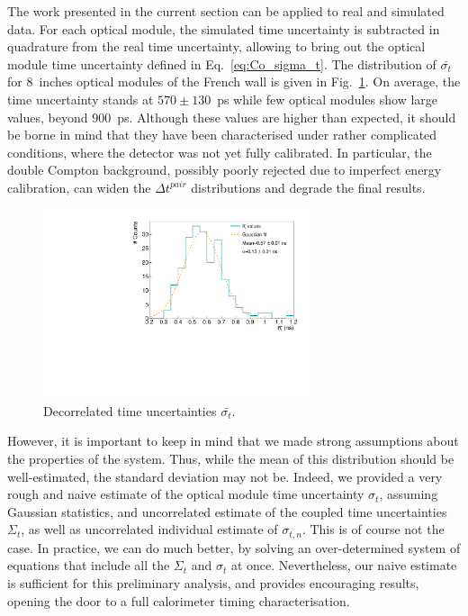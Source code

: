 The work presented in the current section can be applied to real and simulated data.
For each optical module, the simulated time uncertainty is subtracted in quadrature from the real time uncertainty, allowing to bring out the optical module time uncertainty defined in Eq.~\eqref{eq:Co_sigma_t}.
The distribution of $\bar{\sigma_{t}}$ for $8$~inches optical modules of the French wall is given in Fig.~\ref{fig:final_sigmas}.
On average, the time uncertainty stands at $570\pm130$~ps while few optical modules show large values, beyond $900$~ps.
Although these values are higher than expected, it should be borne in mind that they have been characterised under rather complicated conditions, where the detector was not yet fully calibrated.
In particular, the double Compton background, possibly poorly rejected due to imperfect energy calibration, can widen the $\Delta t^{pair}$ distributions and degrade the final results.
\begin{figure}[h]
  \centering
  \includegraphics[width=0.7\textwidth]{CobaltStudy/fig_CobaltStudy/final_sigmas.pdf}
  \caption{Decorrelated time uncertainties $\bar{\sigma_{t}}$.
    \label{fig:final_sigmas}}
\end{figure}

However, it is important to keep in mind that we made strong assumptions about the properties of the system.
Thus, while the mean of this distribution should be well-estimated, the standard deviation may not be.
Indeed, we provided a very rough and naive estimate of the optical module time uncertainty $\sigma_{t}$, assuming Gaussian statistics, and uncorrelated estimate of the coupled time uncertainties $\Sigma_{t}$, as well as uncorrelated individual estimate of $\sigma_{t,n}$.
This is of course not the case.
In practice, we can do much better, by solving an over-determined system of equations that include all the $\Sigma_{t}$ and $\sigma_{t}$ at once.
Nevertheless, our naive estimate is sufficient for this preliminary analysis, and provides encouraging results, opening the door to a full calorimeter timing characterisation.

